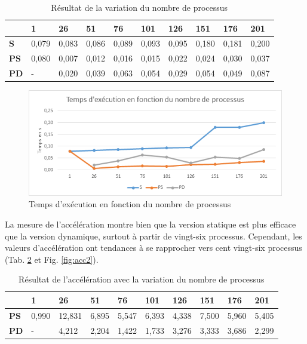 \documentclass[a4paper,12pt]{article}
\begin{document}
\begin{table}[H]
\caption{Résultat de la variation du nombre de processus}
\label{tab:tempsexec2}
\begin{tabular}{|l|l|l|l|l|l|l|l|l|l|}
\hline
            & \textbf{1} & \textbf{26} & \textbf{51} & \textbf{76} & \textbf{101} & \textbf{126} & \textbf{151} & \textbf{176} & \textbf{201} \\ \hline
\textbf{S}  & 0,079      & 0,083       & 0,086       & 0,089       & 0,093        & 0,095        & 0,180        & 0,181        & 0,200        \\ \hline
\textbf{PS} & 0,080      & 0,007       & 0,012       & 0,016       & 0,015        & 0,022        & 0,024        & 0,030        & 0,037        \\ \hline
\textbf{PD} & -          & 0,020       & 0,039       & 0,063       & 0,054        & 0,029        & 0,054        & 0,049        & 0,087        \\ \hline
\end{tabular}
\end{table}

\begin{figure}[H]
\center \includegraphics[width=15cm]{exec2}
\caption{Temps d'exécution en fonction du nombre de processus}
\label{fig:tempsexec2}
\end{figure}

La mesure de l'accélération montre bien que la version statique est plus efficace que la version dynamique, surtout à partir de vingt-six processus. Cependant, les valeurs d'accélération ont tendances à se rapprocher vers cent vingt-six processus (Tab. \ref{tab:acc2} et Fig. \ref{fig:acc2}).

\begin{table}[H]
\caption{Résultat de l'accélération avec la variation du nombre de processus}
\label{tab:acc2}
\begin{tabular}{|l|l|l|l|l|l|l|l|l|l|}
\hline
            & \textbf{1} & \textbf{26} & \textbf{51} & \textbf{76} & \textbf{101} & \textbf{126} & \textbf{151} & \textbf{176} & \textbf{201} \\ \hline
\textbf{PS} & 0,990      & 12,831      & 6,895       & 5,547       & 6,393        & 4,338        & 7,500        & 5,960        & 5,405        \\ \hline
\textbf{PD} & -          & 4,212       & 2,204       & 1,422       & 1,733        & 3,276        & 3,333        & 3,686        & 2,299        \\ \hline
\end{tabular}
\end{table}
\end{document}
